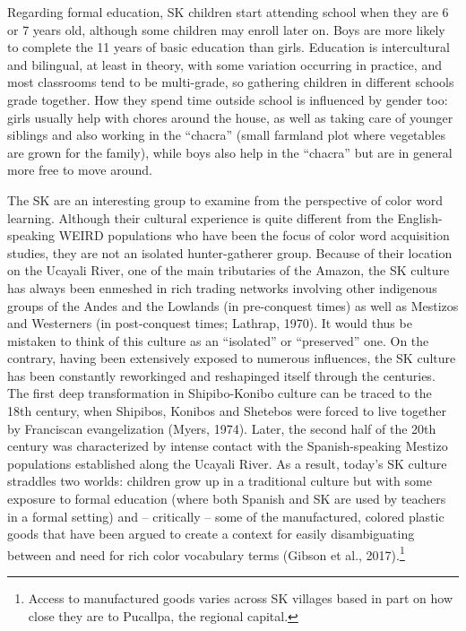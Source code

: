 \documentclass[
  ,apa7,floatsintext]{apa6}
\begin{document}
Regarding formal education, SK children start attending school when they are 6 or 7 years old, although some children may enroll later on. Boys are more likely to complete the 11 years of basic education than girls. Education is intercultural and bilingual, at least in theory, with some variation occurring in practice, and most classrooms tend to be multi-grade, so gathering children in different schools grade together. How they spend time outside school is influenced by gender too: girls usually help with chores around the house, as well as taking care of younger siblings and also working in the ``chacra'' (small farmland plot where vegetables are grown for the family), while boys also help in the ``chacra'' but are in general more free to move around.

The SK are an interesting group to examine from the perspective of color word learning. Although their cultural experience is quite different from the English-speaking WEIRD populations who have been the focus of color word acquisition studies, they are not an isolated hunter-gatherer group. Because of their location on the Ucayali River, one of the main tributaries of the Amazon, the SK culture has always been enmeshed in rich trading networks involving other indigenous groups of the Andes and the Lowlands (in pre-conquest times) as well as Mestizos and Westerners (in post-conquest times; Lathrap, 1970). It would thus be mistaken to think of this culture as an ``isolated'' or ``preserved'' one. On the contrary, having been extensively exposed to numerous influences, the SK culture has been constantly reworkinged and reshapinged itself through the centuries. The first deep transformation in Shipibo-Konibo culture can be traced to the 18th century, when Shipibos, Konibos and Shetebos were forced to live together by Franciscan evangelization (Myers, 1974). Later, the second half of the 20th century was characterized by intense contact with the Spanish-speaking Mestizo populations established along the Ucayali River. As a result, today's SK culture straddles two worlds: children grow up in a traditional culture but with some exposure to formal education (where both Spanish and SK are used by teachers in a formal setting) and -- critically -- some of the manufactured, colored plastic goods that have been argued to create a context for easily disambiguating between and need for rich color vocabulary terms (Gibson et al., 2017).\footnote{Access to manufactured goods varies across SK villages based in part on how close they are to Pucallpa, the regional capital.}
\end{document}
